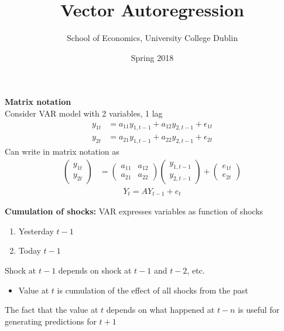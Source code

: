 \documentclass{beamer}
\title{Vector Autoregression}
\author{School of Economics, University College Dublin}
\date{Spring 2018}
\begin{document}
\begin{frame}
 \titlepage
\end{frame}

\begin{frame}
  \textbf{Matrix notation}\\
  Consider VAR model with 2 variables, 1 lag  
\begin{align}
  y_{1t} &= a_{11} y_{1, t-1} + a_{12} y_{2,t-1} + \epsilon_{1t}\\ \nonumber
  y_{2t} &= a_{21} y_{1, t-1} + a_{22} y_{2,t-1} + \epsilon_{2t}
\end{align} 
\medskip
 Can write in matrix notation as 
\begin{align}
   \begin{pmatrix}   y_{1t}\\  y_{2t}   \end{pmatrix} &=
   \begin{pmatrix}   a_{11} & a_{12}\\   a_{21} &a_{22}   \end{pmatrix}  \begin{pmatrix}   y_{1,t-1}\\  y_{2,t-1}  \end{pmatrix} +
   \begin{pmatrix}     e_{1t} \\ e_{2t}   \end{pmatrix}   
\end{align}
\begin{align}  Y_t = AY_{t-1} + e_{t} \end{align}
\end{frame}

\begin{frame}
 \textbf{Cumulation of shocks:} VAR expresses variables as function of shocks
 \begin{enumerate}
   \item Yesterday $t-1$
   \item Today $t-1$
 \end{enumerate}
 \medskip
 Shock at $t-1$ depends on shock at $t-1$ and $t-2$, etc.
 \begin{itemize}
   \item Value at $t$ is cumulation of the effect of all shocks from the past
 \end{itemize}
 \medskip
 The fact that the value at $t$ depends on what happened at $t-n$ is useful for generating predictions for $t+1$
\end{frame}
\end{document}
